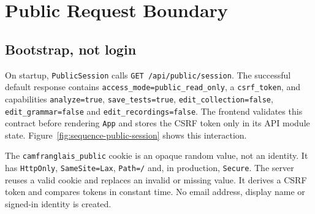 \documentclass[11pt,a4paper]{article}
\begin{document}
\section{Public Request Boundary}
\subsection{Bootstrap, not login}
On startup, \texttt{PublicSession} calls
\nolinkurl{GET /api/public/session}. The successful default response contains
\texttt{access\_mode=public\_read\_only}, a \texttt{csrf\_token}, and capabilities
\texttt{analyze=true}, \texttt{save\_tests=true},
\texttt{edit\_collection=false}, \texttt{edit\_grammar=false} and
\texttt{edit\_recordings=false}. The frontend validates this contract before
rendering \texttt{App} and stores the CSRF token only in its API module state.
Figure~\ref{fig:sequence-public-session} shows this interaction.

The \nolinkurl{camfranglais_public} cookie is an opaque random value, not an
identity. It has \texttt{HttpOnly}, \texttt{SameSite=Lax}, \texttt{Path=/} and,
in production, \texttt{Secure}. The server reuses a valid cookie and replaces
an invalid or missing value. It derives a CSRF token and compares tokens in
constant time. No email address, display name or signed-in identity is created.
\end{document}
